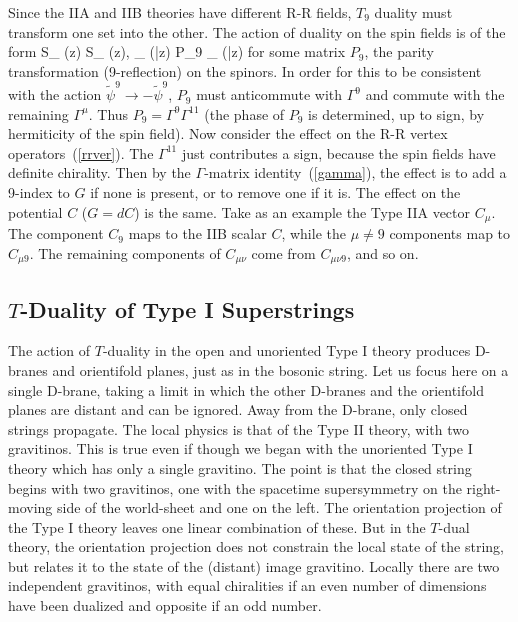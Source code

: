 Since the IIA and IIB theories have different R-R fields, $T_9$ duality
must transform one set into the other.  The action of duality on the spin
fields is of the form
\be
S_{\alpha} (z) \to S_{\alpha} (z),\qquad
{}_{\alpha} (\bar{z}) \to P_9 _{\alpha} (\bar{z}) 
\ee
for some matrix $P_9$, the parity transformation (9-reflection) on the
spinors.  In order for this to be consistent with the action $\tilde\psi^9 \to
-\tilde\psi^9$,
$P_9$ must anticommute with
$\Gamma^9$ and commute with the remaining $\Gamma^\mu$.  Thus
$P_9 =
\Gamma^9\Gamma^{11}$ (the phase of $P_9$ is determined, up to sign, by
hermiticity of the spin field).  Now consider the effect on the R-R vertex
operators~(\ref{rrver}).  The $\Gamma^{11}$ just contributes a sign, because
the spin fields have definite chirality.  Then by the $\Gamma$-matrix
identity~(\ref{gamma}), the effect is to add a 9-index to $G$ if none is
present, or to remove one if it is.  The effect on the potential $C$ ($G =
dC$) is the same.  Take as an example the Type IIA vector $C_\mu$.
The component $C_9$ maps to the IIB scalar $C$, while the $\mu\neq 9$
components map to $C_{\mu 9}$.  The remaining components of $C_{\mu\nu}$
come from $C_{\mu \nu 9}$, and so on.

\subsection{$T$-Duality of Type I Superstrings}

The action of $T$-duality in the open and unoriented Type I theory
produces D-branes and orientifold planes, just as in the bosonic string. 
Let us focus here on a single D-brane, taking a limit
in which the other D-branes and the orientifold planes are
distant and can be ignored.  Away from the D-brane, only closed strings
propagate.  The local physics is that of the Type II theory, with two
gravitinos.  This is true even if though we began with the unoriented Type
I theory which has only a single gravitino.  The point is that the closed
string begins with two gravitinos, one with the spacetime
supersymmetry on the right-moving side of the world-sheet and one on the
left.  The orientation projection of the Type I theory leaves one linear
combination of these.  But in the $T$-dual theory, the
orientation projection does not constrain the local state of the string,
but relates it to the state of the (distant) image gravitino.
Locally there are two independent gravitinos, with equal chiralities if an
even number of dimensions have been dualized and opposite if an odd number.


